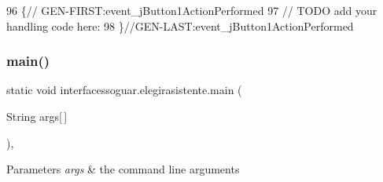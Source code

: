 \begin{DoxyCode}
96                                                                          \{\textcolor{comment}{//
      GEN-FIRST:event\_jButton1ActionPerformed}
97         \textcolor{comment}{// TODO add your handling code here:}
98     \}\textcolor{comment}{//GEN-LAST:event\_jButton1ActionPerformed}
\end{DoxyCode}
\mbox{\label{classinterfacessoguar_1_1elegirasistente_a701a0924715cfb1c8bcf732b83a8bdc9}} 
\subsubsection{\texorpdfstring{main()}{main()}}
{\footnotesize\ttfamily static void interfacessoguar.\+elegirasistente.\+main (\begin{DoxyParamCaption}\item[{String}]{args\mbox{[}$\,$\mbox{]} }\end{DoxyParamCaption})\hspace{0.3cm}{\ttfamily [inline]}, {\ttfamily [static]}}


\begin{DoxyParams}{Parameters}
{\em args} & the command line arguments \\
\hline
\end{DoxyParams}

